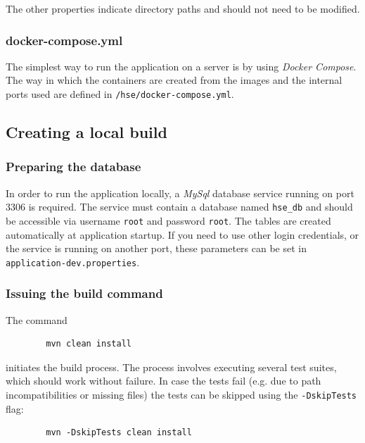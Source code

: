 \documentclass[a4paper]{usiinfbachelorproject}
\begin{document}
\begin{appendices}
        The other properties indicate directory paths and should not need to be modified.

        \subsubsection{docker-compose.yml}

        The simplest way to run the application on a server is by using \emph{Docker Compose}. The way in which the containers are created from the images
        and the internal ports used are defined in 
        \texttt{/hse/docker-compose.yml}.

        \subsection{Creating a local build}

        \subsubsection{Preparing the database}

        In order to run the application locally, a \emph{MySql} database service running on port 3306 is required. The service must contain a database
        named \texttt{hse\_db} and should be accessible via username \texttt{root} and password \texttt{root}. The tables
        are created automatically at application startup. If you need to use other login credentials, or the service is running on another port, these
        parameters can be set in \texttt{application-dev.properties}.

        \subsubsection{Issuing the build command}

        The command
        \begin{verbatim}
        mvn clean install
        \end{verbatim}
        initiates the build process. The process involves executing several test suites, which should work without failure. In case
        the tests fail (e.g. due to path incompatibilities or missing files) the tests can be skipped using the \texttt{-DskipTests} flag:
        \begin{verbatim}
        mvn -DskipTests clean install
        \end{verbatim}


\end{appendices}
\end{document}
